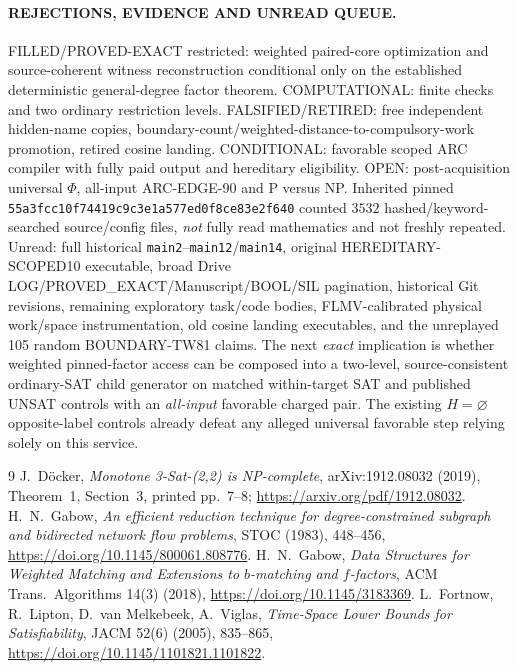 \documentclass[11pt]{article}
\begin{document}
\paragraph{REJECTIONS, EVIDENCE AND UNREAD QUEUE.} FILLED/PROVED-EXACT restricted: weighted paired-core optimization and source-coherent witness reconstruction conditional only on the established deterministic general-degree factor theorem. COMPUTATIONAL: finite checks and two ordinary restriction levels. FALSIFIED/RETIRED: free independent hidden-name copies, boundary-count/weighted-distance-to-compulsory-work promotion, retired cosine landing. CONDITIONAL: favorable scoped ARC compiler with fully paid output and hereditary eligibility. OPEN: post-acquisition universal $\Phi$, all-input ARC-EDGE-90 and P versus NP. Inherited pinned \texttt{55a3fcc10f74419c9c3e1a577ed0f8ce83e2f640} counted $3532$ hashed/keyword-searched source/config files, \emph{not} fully read mathematics and not freshly repeated. Unread: full historical \texttt{main2}--\texttt{main12}/\texttt{main14}, original HEREDITARY-SCOPED10 executable, broad Drive LOG/PROVED\_EXACT/Manuscript/BOOL/SIL pagination, historical Git revisions, remaining exploratory task/code bodies, FLMV-calibrated physical work/space instrumentation, old cosine landing executables, and the unreplayed 105 random BOUNDARY-TW81 claims. The next \emph{exact} implication is whether weighted pinned-factor access can be composed into a two-level, source-consistent ordinary-SAT child generator on matched within-target SAT and published UNSAT controls with an \emph{all-input} favorable charged pair. The existing $H=\varnothing$ opposite-label controls already defeat any alleged universal favorable step relying solely on this service.

\begin{thebibliography}{9}
 J.~D\"ocker, \emph{Monotone 3-Sat-(2,2) is NP-complete}, arXiv:1912.08032 (2019), Theorem~1, Section~3, printed pp.~7--8; \url{https://arxiv.org/pdf/1912.08032}.
 H.~N.~Gabow, \emph{An efficient reduction technique for degree-constrained subgraph and bidirected network flow problems}, STOC (1983), 448--456, \url{https://doi.org/10.1145/800061.808776}.
 H.~N.~Gabow, \emph{Data Structures for Weighted Matching and Extensions to $b$-matching and $f$-factors}, ACM Trans.\ Algorithms 14(3) (2018), \url{https://doi.org/10.1145/3183369}.
 L.~Fortnow, R.~Lipton, D.~van Melkebeek, A.~Viglas, \emph{Time-Space Lower Bounds for Satisfiability}, JACM 52(6) (2005), 835--865, \url{https://doi.org/10.1145/1101821.1101822}.
\end{thebibliography}
\end{document}
